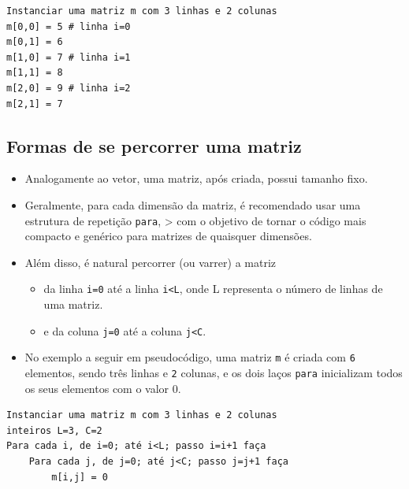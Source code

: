 \documentclass[12pt,a4paper]{article}
\providecommand{\tightlist}{%
      \setlength{\itemsep}{0pt}\setlength{\parskip}{0pt}}
\begin{document}
    \begin{verbatim}
Instanciar uma matriz m com 3 linhas e 2 colunas
m[0,0] = 5 # linha i=0
m[0,1] = 6
m[1,0] = 7 # linha i=1
m[1,1] = 8
m[2,0] = 9 # linha i=2
m[2,1] = 7
\end{verbatim}

    \hypertarget{formas-de-se-percorrer-uma-matriz}{%
\subsection{Formas de se percorrer uma
matriz}\label{formas-de-se-percorrer-uma-matriz}}

    \begin{itemize}
\tightlist
\item
  Analogamente ao vetor, uma matriz, após criada, possui tamanho fixo.
\item
  Geralmente, para cada dimensão da matriz, é recomendado usar uma
  estrutura de repetição \texttt{para}, \textgreater{} com o objetivo de
  tornar o código mais compacto e genérico para matrizes de quaisquer
  dimensões.
\item
  Além disso, é natural percorrer (ou varrer) a matriz

  \begin{itemize}
  \tightlist
  \item
    da linha \texttt{i=0} até a linha \texttt{i\textless{}L}, onde L
    representa o número de linhas de uma matriz.
  \item
    e da coluna \texttt{j=0} até a coluna \texttt{j\textless{}C}.
  \end{itemize}
\item
  No exemplo a seguir em pseudocódigo, uma matriz \texttt{m} é criada
  com \texttt{6} elementos, sendo três linhas e \texttt{2} colunas, e os
  dois laços \texttt{para} inicializam todos os seus elementos com o
  valor 0.
\end{itemize}

    \begin{verbatim}
Instanciar uma matriz m com 3 linhas e 2 colunas 
inteiros L=3, C=2
Para cada i, de i=0; até i<L; passo i=i+1 faça
    Para cada j, de j=0; até j<C; passo j=j+1 faça
        m[i,j] = 0
\end{verbatim}
\end{document}
